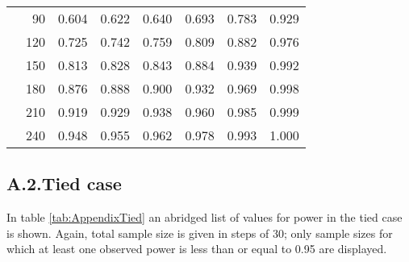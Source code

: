 \documentclass[bimj,fleqn]{w-art}\usepackage[]{graphicx}\usepackage[]{color}
\theoremstyle{plain}
\theoremstyle{definition}
\begin{document}
\begin{table}[ht]
\begin{tabular}{lrrrrrrr}
   & 90 & 0.604 & 0.622 & 0.640 & 0.693 & 0.783 & 0.929 \\ 
   & 120 & 0.725 & 0.742 & 0.759 & 0.809 & 0.882 & 0.976 \\ 
   & 150 & 0.813 & 0.828 & 0.843 & 0.884 & 0.939 & 0.992 \\ 
   & 180 & 0.876 & 0.888 & 0.900 & 0.932 & 0.969 & 0.998 \\ 
   & 210 & 0.919 & 0.929 & 0.938 & 0.960 & 0.985 & 0.999 \\ 
   & 240 & 0.948 & 0.955 & 0.962 & 0.978 & 0.993 & 1.000 \\ 
   \hline
\end{tabular}
\end{table}

\subsection*{A.2.\enspace Tied case}
In table \ref{tab:AppendixTied} an abridged list of values for power in the tied
case is shown. Again, total sample size is given in steps of 30; only sample
sizes for which at least one observed power is less than or equal to 0.95 are
displayed.
\end{document}

